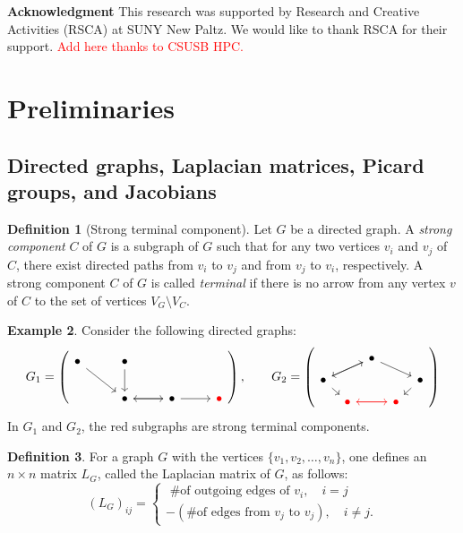 \documentclass[11pt,reqno]{amsart}
\newcommand{\mycirc}[1][black]{\Large\textcolor{#1}{\ensuremath\bullet}}
\theoremstyle{definition}
\newtheorem{mydef}{Definition}[section]
\newtheorem{example}[mydef]{Example}
\theoremstyle{plain}
\begin{document}
\bigskip 


\textbf{Acknowledgment}\hspace{0.1cm} This research was supported by Research and Creative Activities (RSCA) at SUNY New Paltz. We would like to thank RSCA for their support. \textcolor{red}{Add here thanks to CSUSB HPC.}

\section{Preliminaries}\label{section: preliminaries}

\subsection{Directed graphs, Laplacian matrices, Picard groups, and Jacobians}

\begin{mydef}[Strong terminal component]
Let $G$ be a directed graph. 
A \textit{strong component} $C$ of $G$ is a subgraph of $G$ such that for any two vertices $v_i$ and $v_j$ of $C$, there exist directed paths from $v_i$ to $v_j$ and from $v_j$ to $v_i$, respectively.
A strong component $C$ of $G$ is called \textit{terminal} if there is no arrow from any vertex $v$ of $C$ to the set of vertices $V_G \setminus V_C$. 
\end{mydef}

\begin{example}
Consider the following directed graphs:
\[
G_1=\left(\begin{tikzcd}
	\bullet  \arrow[dr,swap]
	& \bullet \arrow[d,swap] \\
	& \bullet\arrow[r,swap] & \bullet \arrow[l] \arrow[r,swap] & \mycirc[red]
\end{tikzcd} \right), \qquad 
G_2=\left( \begin{tikzcd}[row sep=0.2cm, column sep=0.2cm]
	& & \bullet \arrow[drr] \arrow[dll]& &  \\ 
	\bullet \arrow[urr] \arrow[dr] & & & & \bullet \arrow[dl] \\ 
	& \mycirc[red] \arrow[rr,red] & & \mycirc[red] \arrow[ll,red]& 
\end{tikzcd}\right)
\]
In $G_1$ and $G_2$, the red subgraphs are strong terminal components. 
\end{example}

\begin{mydef}\label{definition: directed laplacian}
	For a graph $G$ with the vertices $\{v_1,v_2,\dots,v_n\}$, one defines an $n\times n$ matrix $L_G$, called the Laplacian matrix of $G$, as follows:
	\[
	(L_G)_{ij}=\begin{cases}
		\textrm{ \# of outgoing edges of $v_i$}, \quad i=j\\
		-(\textrm{\# of edges from $v_j$ to $v_j$}), \quad i \neq j.
	\end{cases}
	\]
\end{mydef}
\end{document}
